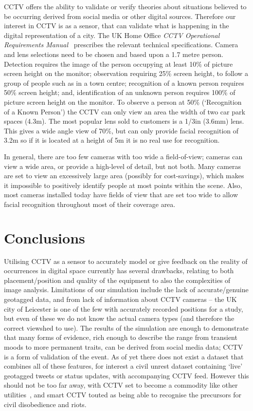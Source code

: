 \documentclass[conference]{IEEEtran}
\begin{document}
CCTV offers the ability to validate or verify theories about
situations believed to be occurring derived from social media or other
digital sources. Therefore our interest in CCTV is as a sensor, that
can validate what is happening in the digital representation of a
city. The UK Home Office {\emph{CCTV Operational Requirements
Manual}}~\cite{ukhocctv:2009} prescribes the relevant technical
specifications. Camera and lens selections need to be chosen and based
upon a 1.7 metre person. Detection requires the image of the person
occupying at least 10\% of picture screen height on the monitor;
observation requiring 25\% screen height, to follow a group of people
such as in a town centre; recognition of a known person requires 50\%
screen height; and, identification of an unknown person requires 100\%
of picture screen height on the monitor. To observe a person at 50\%
(`Recognition of a Known Person') the CCTV can only view an area the
width of two car park spaces (4.3m). The most popular lens sold to
customers is a 1/3in (3.6mm) lens. This gives a wide angle view of
70\%, but can only provide facial recognition of 3.2m so if it is
located at a height of 5m it is no real use for recognition.

In general, there are too few cameras with too wide a field-of-view;
cameras can view a wide area, or provide a high-level of detail, but
not both. Many cameras are set to view an excessively large area
(possibly for cost-savings), which makes it impossible to positively
identify people at most points within the scene. Also, most cameras
installed today have fields of view that are set too wide to allow
facial recognition throughout most of their coverage area.


\section{Conclusions}\label{conc}

Utilising CCTV as a sensor to accurately model or give feedback on the
reality of occurrences in digital space currently has several
drawbacks, relating to both placement/position and quality of the
equipment to also the complexities of image analysis. Limitations of
our simulation include the lack of accurate/genuine geotagged data,
and from lack of information about CCTV cameras -- the UK city of
Leicester is one of the few with accurately recorded positions for a
study, but even of these we do not know the actual camera types (and
therefore the correct viewshed to use). The results of the simulation
are enough to demonstrate that many forms of evidence, rich enough to
describe the range from transient moods to more permanent traits, can
be derived from social media data; CCTV is a form of validation of the
event. As of yet there does not exist a dataset that combines all of
these features, for interest a civil unrest dataset containing `live'
geotagged tweets or status updates, with accompanying CCTV
feed. However this should not be too far away, with CCTV set to become
a commodity like other utilities~\cite{graham:2002}, and smart CCTV
touted as being able to recognise the precursors for civil
disobedience and riots.
\end{document}

